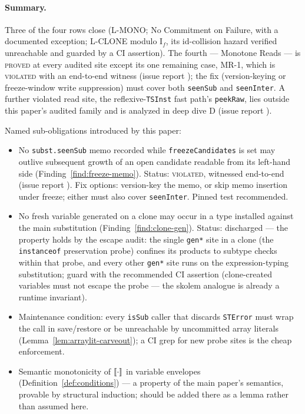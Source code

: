 \documentclass[11pt]{article}
\begin{document}
\paragraph{Summary.} Three of the four rows close (L-MONO; No
Commitment on Failure, with a documented exception; L-CLONE modulo
I$_f$, its id-collision hazard verified unreachable and guarded by a CI
assertion). The fourth — Monotone Reads — is \textsc{proved} at every
audited site except its one remaining case, MR-1, which is
\textsc{violated} with an end-to-end witness (issue report
); the fix
(version-keying or freeze-window write suppression) must cover both
\texttt{seenSub} and \texttt{seenInter}. A further violated read site,
the reflexive-\texttt{TSInst} fast path's \texttt{peekRaw}, lies
outside this paper's audited family and is analyzed in deep dive D
(issue report
).

Named sub-obligations introduced by this paper:

\begin{itemize}
\item[\textbf{MR-1}] No \texttt{subst.seenSub} memo recorded while
  \texttt{freezeCandidates} is set may outlive subsequent growth of an
  open candidate readable from its left-hand side
  (Finding~\ref{find:freeze-memo}). Status: \textsc{violated}, witnessed
  end-to-end (issue report
  ). Fix options:
  version-key the memo, or skip memo insertion under freeze; either must
  also cover \texttt{seenInter}. Pinned test recommended.
\item[\textbf{CL-1}] No fresh variable generated on a clone may occur in
  a type installed against the main substitution
  (Finding~\ref{find:clone-gen}). Status: discharged — the property
  holds by the escape audit: the single \texttt{gen*} site in a clone
  (the \texttt{instanceof} preservation probe) confines its products to
  subtype checks within that probe, and every other \texttt{gen*} site runs on
  the expression-typing substitution; guard with the recommended CI
  assertion (clone-created variables must not escape the probe — the
  skolem analogue is already a runtime invariant).
\item[\textbf{RB-1}] Maintenance condition: every \texttt{isSub} caller
  that discards \texttt{STError} must wrap the call in save/restore or
  be unreachable by uncommitted array literals
  (Lemma~\ref{lem:arraylit-carveout}); a CI grep for new probe sites is
  the cheap enforcement.
\item[\textbf{M1}] Semantic monotonicity of $\llbracket \cdot \rrbracket$ in variable
  envelopes (Definition~\ref{def:conditions}) — a property of the main
  paper's semantics, provable by structural induction; should be added
  there as a lemma rather than assumed here.
\end{itemize}
\end{document}
